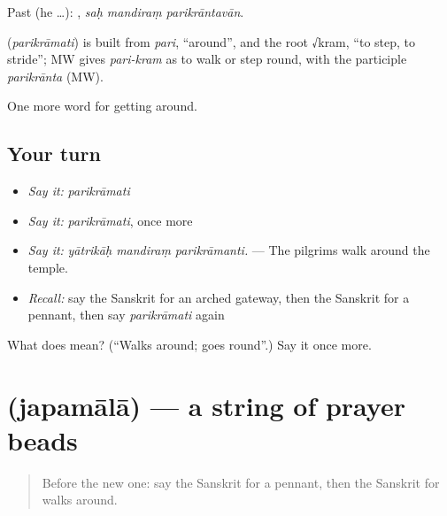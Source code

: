 Past (he …):   , \emph{saḥ mandiraṃ parikrāntavān}.

\begin{cousinweb}
\textbf{} (\emph{parikrāmati}) is built from \emph{pari}, \textquotedblleft{}around\textquotedblright{}, and the root √kram, \textquotedblleft{}to step, to stride\textquotedblright{}; MW gives \emph{pari-kram} as to walk or step round, with the participle \emph{parikrānta} (MW).
\end{cousinweb}

\begin{grammarlens}[title={What you've built}]
One more word for getting around.
\end{grammarlens}

\subsection*{Your turn}
\begin{itemize}
\raggedright
  \item \emph{Say it:} \emph{parikrāmati}
  \item \emph{Say it:} \emph{parikrāmati}, once more
  \item \emph{Say it:} \emph{yātrikāḥ mandiraṃ parikrāmanti.} — The pilgrims walk around the temple.
  \item \emph{Recall:} say the Sanskrit for an arched gateway, then the Sanskrit for a pennant, then say \emph{parikrāmati} again
\end{itemize}

\begin{tcolorbox}[breakable,colback=teal!4,colframe=teal!35!black,title={Before you move on}]
What does  mean? (\textquotedblleft{}Walks around; goes round\textquotedblright{}.) Say it once more.
\end{tcolorbox}
\section[\texorpdfstring{\sk{जपमाला} (japamālā)}{जपमाला (japamālā)}]{ (japamālā) — a string of prayer beads}

\label{lesson:SA-C400-japamala}



\begin{quote}
Before the new one: say the Sanskrit for a pennant, then the Sanskrit for walks around.
\end{quote}

